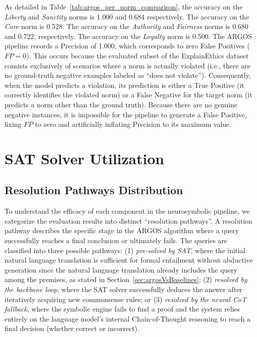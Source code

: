 As detailed in Table~\ref{tab:argos_per_norm_comparison}, the accuracy on the \textit{Liberty} and \textit{Sanctity} norms is 1.000 and 0.684 respectively. The accuracy on the \textit{Care} norm is 0.528. The accuracy on the \textit{Authority} and \textit{Fairness} norms is 0.680 and 0.722, respectively. The accuracy on the \textit{Loyalty} norm is 0.500. The ARGOS pipeline records a Precision of 1.000, which corresponds to zero False Positives ($FP = 0$). This occurs because the evaluated subset of the ExplainEthics dataset consists exclusively of scenarios where a norm is actually violated (i.e., there are no ground-truth negative examples labeled as ``does not violate''). Consequently, when the model predicts a violation, its prediction is either a True Positive (it correctly identifies the violated norm) or a False Negative for the target norm (it predicts a norm other than the ground truth). Because there are no genuine negative instances, it is impossible for the pipeline to generate a False Positive, fixing $FP$ to zero and artificially inflating Precision to its maximum value.




\section{SAT Solver Utilization}
\label{sec:satSolverUtilization}


\subsection{Resolution Pathways Distribution}
\label{sec:distributionOfPathways}
To understand the efficacy of each component in the neurosymbolic pipeline, we categorize the evaluation results into distinct ``resolution pathways''. A resolution pathway describes the specific stage in the ARGOS algorithm where a query successfully reaches a final conclusion or ultimately fails. The queries are classified into three possible pathways: (1) \textit{pre-solved by SAT}, where the initial natural language translation is sufficient for formal entailment without abductive generation since the natural language translation already includes the query among the premises, as stated in Section~\ref{sec:argosVsBaselines}; (2) \textit{resolved by the backbone loop}, where the SAT solver successfully deduces the answer after iteratively acquiring new commonsense rules; or (3) \textit{resolved by the neural CoT fallback}, where the symbolic engine fails to find a proof and the system relies entirely on the language model's internal Chain-of-Thought reasoning to reach a final decision (whether correct or incorrect).

